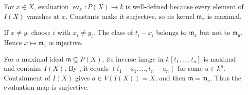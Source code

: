 For $x\in X$, evaluation $\operatorname{ev}_x:P(X)\to k$ is well-defined because every element of $I(X)$ vanishes at $x$. Constants make it surjective, so its kernel $\mathfrak m_x$ is maximal.

If $x\neq y$, choose $i$ with $x_i\neq y_i$. The class of $t_i-x_i$ belongs to $\mathfrak m_x$ but not to $\mathfrak m_y$. Hence $x\mapsto\mathfrak m_x$ is injective.

For a maximal ideal $\mathfrak m\subseteq P(X)$, its inverse image in $k[t_1,\ldots,t_n]$ is maximal and contains $I(X)$. By , it equals $(t_1-a_1,\ldots,t_n-a_n)$ for some $a\in k^n$. Containment of $I(X)$ gives $a\in V(I(X))=X$, and then $\mathfrak m=\mathfrak m_a$. Thus the evaluation map is surjective.

